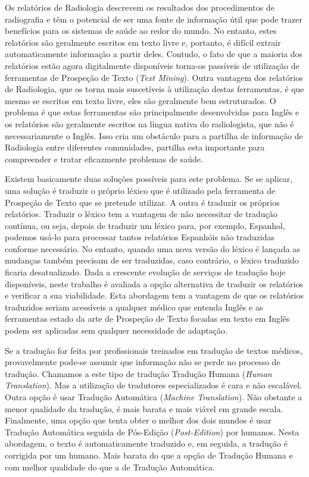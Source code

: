 \begin{abstractspt}
	
Os relatórios de Radiologia descrevem os resultados dos procedimentos de radiografia e têm o potencial de ser uma fonte de informação útil que pode trazer benefícios para os sistemas de saúde ao redor do mundo. No entanto, estes relatórios são geralmente escritos em texto livre e, portanto, é difícil extrair automaticamente informação a partir deles. Contudo, o fato de que a maioria dos relatórios estão agora digitalmente disponíveis torna-os passíveis de utilização de ferramentas de Prospeção de Texto (\textit{Text Mining}). Outra vantagem dos relatórios de Radiologia, que os torna mais suscetíveis à utilização destas ferramentas, é que mesmo se escritos em texto livre, eles são geralmente bem estruturados. O problema é que estas ferramentas são principalmente desenvolvidas para Inglês e os relatórios são geralmente escritos na língua nativa do radiologista, que não é necessariamente o Inglês. Isso cria um obstáculo para a partilha de informação de Radiologia entre diferentes comunidades, partilha esta importante para compreender e tratar eficazmente problemas de saúde.

Existem basicamente duas soluções possíveis para este problema. Se se aplicar, uma solução é traduzir o próprio léxico que é utilizado pela ferramenta de Prospeção de Texto que se pretende utilizar. A outra é traduzir os próprios relatórios. Traduzir o léxico tem a vantagem de não necessitar de tradução contínua, ou seja, depois de traduzir um léxico para, por exemplo, Espanhol, podemos usá-lo para processar tantos relatórios Espanhóis não traduzidas conforme necessário. No entanto, quando uma nova versão do léxico é lançada as mudanças também precisam de ser traduzidas, caso contrário, o léxico traduzido ficaria desatualizado. Dada a crescente evolução de serviços de tradução hoje disponíveis, neste trabalho é avaliada a opção alternativa de traduzir os relatórios e verificar a sua viabilidade. Esta abordagem tem a vantagem de que os relatórios traduzidos seriam acessíveis a qualquer médico que entenda Inglês e as ferramentas estado da arte de Prospeção de Texto focadas em texto em Inglês podem ser aplicadas sem qualquer necessidade de adaptação.

Se a tradução for feita por profissionais treinados em tradução de textos médicos, provavelmente pode-se assumir que informação não se perde no processo de tradução. Chamamos a este tipo de tradução Tradução Humana (\textit{Human Translation}). Mas a utilização de tradutores especializados é cara e não escalável. Outra opção é usar Tradução Automática (\textit{Machine Translation}). Não obstante a menor qualidade da tradução, é mais barata e mais viável em grande escala. Finalmente, uma opção que tenta obter o melhor dos dois mundos é usar Tradução Automática seguida de Pós-Edição (\textit{Post-Edition}) por humanos. Nesta abordagem, o texto é automaticamente traduzido e, em seguida, a tradução é corrigida por um humano. Mais barata do que a opção de Tradução Humana e com melhor qualidade do que a de Tradução Automática.


\end{abstractspt}
